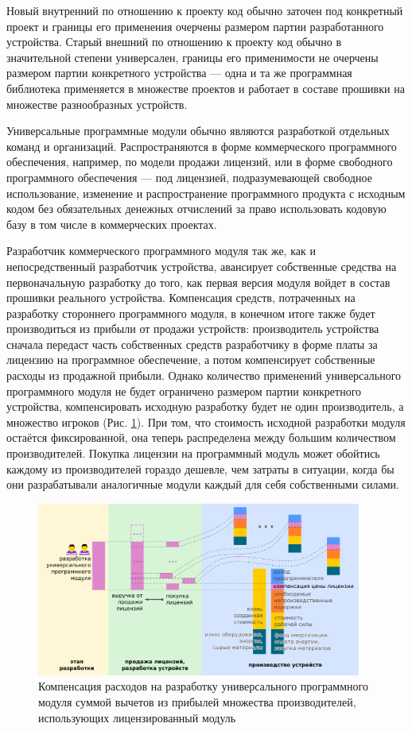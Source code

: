 \documentclass{article}
\begin{document}
Новый внутренний по отношению к проекту код обычно заточен под конкретный проект и границы его применения очерчены размером партии разработанного устройства. Старый внешний по отношению к проекту код обычно в значительной степени универсален, границы его применимости не очерчены размером партии конкретного устройства — одна и та же программная библиотека применяется в множестве проектов и работает в составе прошивки на множестве разнообразных устройств.

Универсальные программные модули обычно являются разработкой отдельных команд и организаций. Распространяются в форме коммерческого программного обеспечения, например, по модели продажи лицензий, или в форме свободного программного обеспечения — под лицензией, подразумевающей свободное использование, изменение и распространение программного продукта с исходным кодом без обязательных денежных отчислений за право использовать кодовую базу в том числе в коммерческих проектах.

Разработчик коммерческого программного модуля так же, как и непосредственный разработчик устройства, авансирует собственные средства на первоначальную разработку до того, как первая версия модуля войдет в состав прошивки реального устройства. Компенсация средств, потраченных на разработку стороннего программного модуля, в конечном итоге также будет производиться из прибыли от продажи устройств: производитель устройства сначала передаст часть собственных средств разработчику в форме платы за лицензию на программное обеспечение, а потом компенсирует собственные расходы из продажной прибыли. Однако количество применений универсального программного модуля не будет ограничено размером партии конкретного устройства, компенсировать исходную разработку будет не один производитель, а множество игроков (Рис. \ref{fig:model_hard_soft_license_module}). При том, что стоимость исходной разработки модуля остаётся фиксированной, она теперь распределена между большим количеством производителей. Покупка лицензии на программный модуль может обойтись каждому из производителей гораздо дешевле, чем затраты в ситуации, когда бы они разрабатывали аналогичные модули каждый для себя собственными силами.

\begin{figure}[h]
    \centering
    \includegraphics[width=0.95\textwidth]{model-hard-soft-license-module}
    \caption{Компенсация расходов на разработку универсального программного модуля суммой вычетов из прибылей множества производителей, использующих лицензированный модуль}
    \label{fig:model_hard_soft_license_module}
\end{figure}
\end{document}
